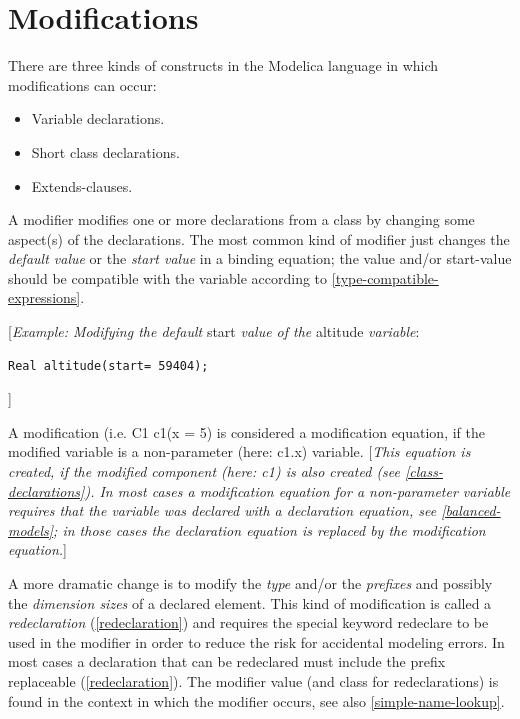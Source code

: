 \documentclass[10pt,a4paper]{report}
\def\doublelabel#1{\label{#1}\hypertarget{#1}{}}
\begin{document}
\section{Modifications}\doublelabel{modifications}

There are three kinds of constructs in the Modelica language in which
modifications can occur:

\begin{itemize}
\item
  Variable declarations.
\item
  Short class declarations.
\item
  Extends-clauses.
\end{itemize}

A modifier modifies one or more declarations from a class by changing
some aspect(s) of the declarations. The most common kind of modifier
just changes the \emph{default value} or the \emph{start value} in a
binding equation; the value and/or start-value should be compatible with
the variable according to \ref{type-compatible-expressions}.

{[}\emph{Example: Modifying the default} start \emph{value of the}
altitude \emph{variable}:
\begin{lstlisting}[language=modelica]
Real altitude(start= 59404);
\end{lstlisting}
{]}

A modification (i.e. C1 c1(x = 5) is considered a modification equation,
if the modified variable is a non-parameter (here: c1.x) variable.
{[}\emph{This equation is created, if the modified component (here: c1)
is also created (see \ref{class-declarations}). In most cases a
modification equation for a non-parameter variable requires that the
variable was declared with a declaration equation, see \ref{balanced-models}; 
in those cases the declaration equation is replaced by the
modification equation.}{]}

A more dramatic change is to modify the \emph{type} and/or the
\emph{prefixes} and possibly the \emph{dimension sizes} of a declared
element. This kind of modification is called a \emph{redeclaration}
(\ref{redeclaration}) and requires the special keyword redeclare to be used in
the modifier in order to reduce the risk for accidental modeling errors.
In most cases a declaration that can be redeclared must include the
prefix replaceable (\ref{redeclaration}). The modifier value (and class for
redeclarations) is found in the context in which the modifier occurs,
see also \ref{simple-name-lookup}.
\end{document}
